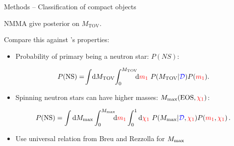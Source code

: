 \documentclass[usenames,dvipsnames,t]{beamer}
\newcommand{\mtov}{M_{\text{TOV}}}
\begin{document}
\begin{frame}{Methods -- Classification of compact objects}
  
  \def\x{3mm}

  \textsc{NMMA}  give posterior on $\mtov$. 
  
  Compare this against 's properties:

  \begin{itemize}
    \vspace{\x}

    \item Probability of primary being a neutron star: $P(NS)$:
    
    \begin{equation*}
      P(\text{NS}) = \!\int \!\differential\mtov \!\int_{0}^{\mtov}\! \! \! \differential \red{m_1} \ P(\mtov|\blue{\mathcal{D}}) P(\red{m_1}).
    \end{equation*}

    \vspace{\x}

    \item Spinning neutron stars can have higher masses: $M_{\rm{max}}(\rm{EOS}, \textcolor{red}{\chi_1})$:
    
    \begin{equation*}
      P(\text{NS}) = \int \differential M_{\rm{max}}\int_{0}^{M_{\rm{max}}} \! \! \!\differential \red{m_1} \int_0^1 \differential \red{\chi_1} \ P(M_{\rm{max}}|\blue{\mathcal{D}}, \red{\chi_1}) P(\red{m_1}, \red{\chi_1}) \, .
    \end{equation*}

    \vspace{\x}

    \item Use universal relation from Breu and Rezzolla for $M_{\rm{max}}$~\cite{Breu:2016ufb}
  \end{itemize}

\end{frame}
\end{document}
